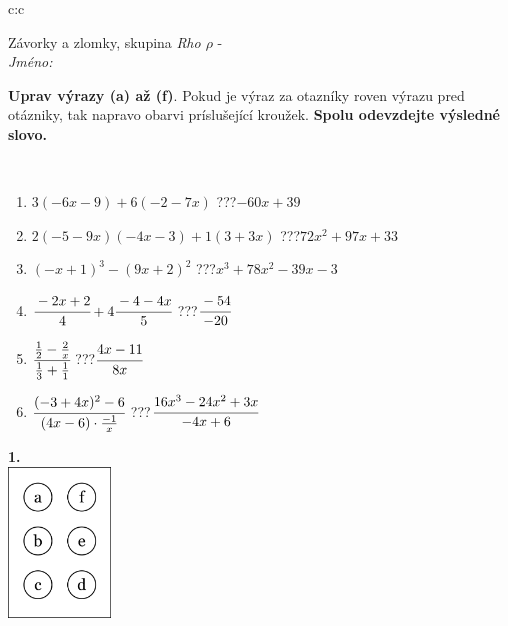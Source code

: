 \documentclass[10pt]{report}
\begin{document}
\begin{tabular}{c:c}
\begin{minipage}[c][104.5mm][t]{0.5\linewidth}
\begin{center}
\vspace{7mm}
{\huge Závorky a zlomky, skupina \textit{Rho $\rho$} -}\\[5mm]
\textit{Jméno:}\phantom{xxxxxxxxxxxxxxxxxxxxxxxxxxxxxxxxxxxxxxxxxxxxxxxxxxxxxxxxxxxxxxxxx}\\[5mm]
\begin{minipage}{0.95\linewidth}
\begin{center}
\textbf{Uprav výrazy (a) až (f)}. Pokud je výraz za otazníky roven výrazu pred otázniky, tak napravo obarvi príslušející kroužek. \textbf{Spolu odevzdejte výsledné slovo.}
\end{center}
\end{minipage}
\\[1mm]
\begin{minipage}{0.79\linewidth}
\begin{center}
\begin{varwidth}{\linewidth}
\begin{enumerate}
\normalsize
\item $3(-6x-9)+6(-2-7x)$\quad \dotfill\; ???\;\dotfill \quad $-60x+39$
\item $2(-5-9x)(-4x-3)+1(3+3x)$\quad \dotfill\; ???\;\dotfill \quad $72x^2+97x+33$
\item $(-x+1)^3-(9x+2)^2$\quad \dotfill\; ???\;\dotfill \quad $x^3+78x^2-39x-3$
\item $\cfrac{-2x+2}{4}+4\cfrac{-4-4x}{5}$\quad \dotfill\; ???\;\dotfill \quad $\cfrac{-54}{-20}$
\item $\cfrac{\frac{1}{2}-\frac{2}{x}}{\frac{1}{3}+\frac{1}{1}}$\quad \dotfill\; ???\;\dotfill \quad $\cfrac{4x-11}{8x}$
\item $\cfrac{(-3+4x)^2-6}{(4x-6)\cdot\frac{-1}{x}}$\quad \dotfill\; ???\;\dotfill \quad $\cfrac{16x^3-24x^2+3x}{-4x+6}$
\end{enumerate}
\end{varwidth}
\end{center}
\end{minipage}
\begin{minipage}{0.20\linewidth}
\begin{center}
{\Huge\bfseries 1.} \\[2mm]
\includegraphics[height=40mm]{../images/braille.png}

\end{center}
\end{minipage}
\end{center}
\end{minipage}
\end{tabular}
\end{document}
